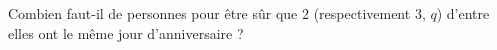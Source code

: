 Combien faut-il de personnes pour être sûr que $2$ (respectivement $3$, $q$) d'entre elles ont le même jour d'anniversaire ?

